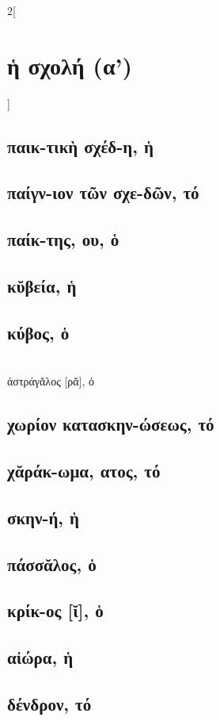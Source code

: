 \documentclass{book}
\begin{document}
\begin{multicols}{2}[\section{ἡ σχολή (α')}]
\subsection{παικ-τικὴ σχέδ-η, ἡ}
\subsection{παίγν-ιον τῶν σχε-δῶν, τό}
\subsection{παίκ-της, ου, ὁ}
\subsection{κῠβεία, ἡ}
\subsection{κύβος, ὁ}  ~\\
ἀστράγᾰλος [ρᾰ], ὁ 
\subsection{χωρίον κατασκην-ώσεως, τό}
\subsection{χᾰράκ-ωμα, ατος, τό}
\subsection{σκην-ή, ἡ}
\subsection{πάσσᾰλος, ὁ}
\subsection{κρίκ-ος [ῐ], ὁ}
\subsection{αἰώρα, ἡ}
\subsection{δένδρον, τό}
~
\end{multicols}
\end{document}
